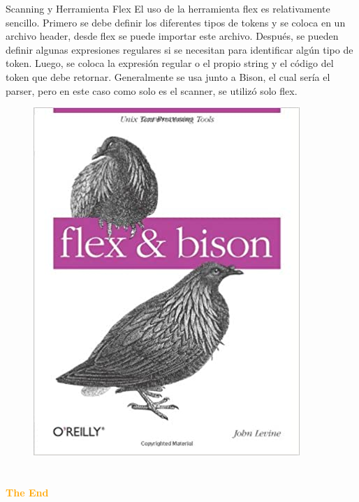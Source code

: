 \documentclass[aspectratio=43]{beamer}
\begin{document}
    \begin{frame}{Scanning y Herramienta Flex}
        El uso de la herramienta flex es relativamente sencillo. Primero se debe definir los diferentes tipos de tokens y se coloca en un archivo header, desde flex se puede importar este archivo. Después, se pueden definir algunas expresiones regulares si se necesitan para identificar algún tipo de token. Luego, se coloca la expresión regular o el propio string y el código del token que debe retornar. Generalmente se usa junto a Bison, el cual sería el parser, pero en este caso como solo es el scanner, se utilizó solo flex. \\
        \begin{figure}[h]
            \centerline{\includegraphics[scale=.20]{flex.jpg}}
        \end{figure}
    \end{frame}

    

    \section{}
    \begin{frame}{}
        \centering
            \Huge\bfseries
        \textcolor{orange}{The End}
    \end{frame}
\end{document}
